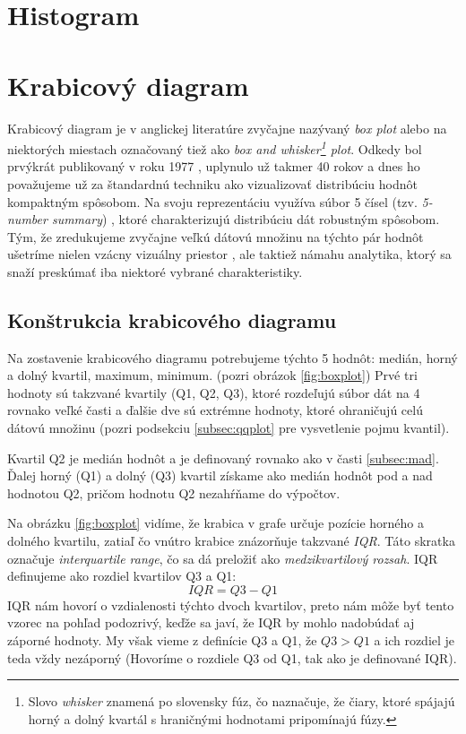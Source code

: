 \section{Histogram}

\section{Krabicový diagram}
\label{subsec:boxplot}
Krabicový diagram je v anglickej literatúre zvyčajne nazývaný \textit{box plot} alebo na niektorých miestach označovaný tiež ako \textit{box and whisker\footnote{Slovo \textit{whisker} znamená po slovensky fúz, čo naznačuje, že čiary, ktoré spájajú horný a dolný kvartál s hraničnými hodnotami pripomínajú fúzy.} plot}. Odkedy bol prvýkrát publikovaný v roku 1977 \cite{Tukey}, uplynulo už takmer 40 rokov a dnes ho považujeme už za štandardnú techniku ako vizualizovať distribúciu hodnôt kompaktným spôsobom. Na svoju reprezentáciu využíva súbor 5 čísel (tzv. \textit{\mbox{5-number} summary}) \cite{Potter}, ktoré charakterizujú distribúciu dát robustným spôsobom. Tým, že zredukujeme zvyčajne veľkú dátovú množinu na týchto pár hodnôt ušetríme nielen vzácny vizuálny priestor \cite{Wickham}, ale taktiež námahu analytika, ktorý sa snaží preskúmať iba niektoré vybrané charakteristiky. 

\subsection{Konštrukcia krabicového diagramu}

Na zostavenie krabicového diagramu potrebujeme týchto 5 hodnôt: medián, horný a dolný kvartil, maximum, minimum. (pozri obrázok \ref{fig:boxplot}) Prvé tri hodnoty sú takzvané kvartily (Q1, Q2, Q3), ktoré rozdeľujú súbor dát na 4 rovnako veľké časti a ďalšie dve sú extrémne hodnoty, ktoré ohraničujú celú dátovú množinu (pozri podsekciu \ref{subsec:qqplot} pre vysvetlenie pojmu kvantil). 

Kvartil Q2 je medián hodnôt a je definovaný rovnako ako v časti \ref{subsec:mad}. Ďalej horný (Q1) a dolný (Q3) kvartil získame ako medián hodnôt pod a nad hodnotou Q2, pričom hodnotu Q2 nezahŕňame do výpočtov. 

Na obrázku \ref{fig:boxplot} vidíme, že krabica v grafe určuje pozície horného a dolného kvartilu, zatiaľ čo vnútro krabice znázorňuje takzvané \textit{IQR}. Táto skratka označuje \textit{interquartile range}, čo sa dá preložiť ako \textit{medzikvartilový rozsah}. IQR definujeme ako rozdiel kvartilov Q3 a Q1:
\[
IQR = Q3 - Q1
\]
IQR nám hovorí o vzdialenosti týchto dvoch kvartilov, preto nám môže byť tento vzorec na pohľad podozrivý, keďže sa javí, že IQR by mohlo nadobúdať aj záporné hodnoty. My však vieme z definície Q3 a Q1, že $ Q3 > Q1 $ a ich rozdiel je teda vždy nezáporný (Hovoríme o rozdiele Q3 od Q1, tak ako je definované IQR).

